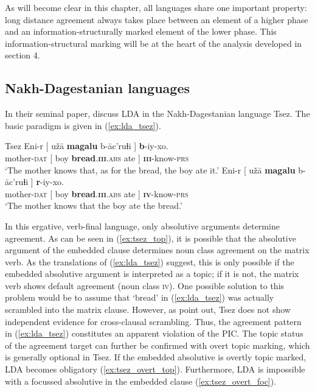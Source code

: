 \documentclass[output=paper
,modfonts
,nonflat]{langsci/langscibook}
\begin{document}
As will become clear in this chapter, all languages share one important property: long distance agreement always takes place between an element of a higher phase and an information-structurally marked element of the lower phase. This information-structural marking will be at the heart of the analysis developed in section 4.

\subsection{Nakh-Dagestanian languages}

In their seminal paper, \citet{Polinsky_Potsdam2001} discuss LDA in the Nakh-Dagestanian language Tsez. The basic paradigm is given in (\ref{ex:lda_tsez}).
\begin{exe}
	\ex Tsez \citep[][584]{Polinsky_Potsdam2001} \label{ex:lda_tsez}
	\xlist
	\ex	\label{ex:tsez_top}
		\gll Eni-r [ u\v{z}\=a \textbf{magalu} b-\=ac’ruɬi ] \textbf{b}-iy-xo.\\
			 mother-\textsc{dat} [ boy \textbf{bread}.\textsc{\textbf{iii}.abs} ate ]	\textsc{\textbf{iii}}-know-\textsc{prs}\\
	 	\glt `The mother knows that, as for the bread, the boy ate it.' 
	\ex 
		\gll Eni-r [ u\v{z}\=a \textbf{magalu} b-\=ac’ruɬi ] \textbf{r}-iy-xo.\\
			 mother-\textsc{dat} [ boy \textbf{bread}.\textsc{\textbf{iii}.abs} ate ] \textsc{\textbf{iv}}-know-\textsc{prs}\\
	    \glt `The mother knows that the boy ate the bread.'
	\endxlist
\end{exe} 
In this ergative, verb-final language, only absolutive arguments determine agreement. As can be seen in (\ref{ex:tsez_top}), it is possible that the absolutive argument of the embedded clause determines noun class agreement on the matrix verb. As the translations of (\ref{ex:lda_tsez}) suggest, this is only possible if the embedded absolutive argument is interpreted as a topic; if it is not, the matrix verb shows default agreement (noun class \textsc{iv}). One possible solution to this problem would be to assume that `bread' in (\ref{ex:lda_tsez}) was actually scrambled into the matrix clause. However, as \citet[][590]{Polinsky_Potsdam2001} point out, Tsez does not show independent evidence for cross-clausal scrambling. Thus, the agreement pattern in (\ref{ex:lda_tsez}) constitutes an apparent violation of the PIC. The topic status of the agreement target can further be confirmed with overt topic marking, which is generally optional in Tsez. If the embedded absolutive is overtly topic marked, LDA becomes obligatory (\ref{ex:tsez_overt_top}). Furthermore, LDA is impossible with a focussed absolutive in the embedded clause (\ref{ex:tsez_overt_foc}).
\end{document}
